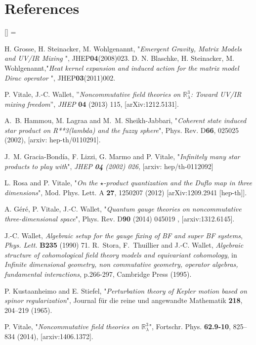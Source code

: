 \documentclass[a4paper,11pt,twoside]{article}
\numberwithin{equation}{section}
\theoremstyle{nonumberplain}
\newcounter{and}
\renewenvironment{thebibliography}[1]{%
\section*{References}%
\frenchspacing\small%
\begin{list}{[\arabic{enumi}]}%
{%
\usecounter{enumi}\parsep=2pt\topsep 0pt%
\settowidth{\labelwidth}{[#1]}%
\leftmargin=\labelwidth\advance\leftmargin\labelsep%
\rightmargin=0pt\itemsep=1pt\sloppy%
}%
}{\end{list}}
\begin{document}
\begin{thebibliography}{88}
 H. Grosse, H. Steinacker, M. Wohlgenannt, "{\it{Emergent Gravity, Matrix Models and UV/IR Mixing }}", JHEP{\bf{04}}(2008)023. D. N. Blaschke, H. Steinacker, M. Wohlgenannt,"{\it{Heat kernel expansion and induced action for the matrix model Dirac operator }}", JHEP{\bf{03}}(2011)002.

 P. Vitale, J.-C. Wallet, ''{\it{Noncommutative field theories on $\mathbb{R}^3_\lambda$: Toward UV/IR mixing freedom}}'', \textit{JHEP} \textbf{04} (2013) 115, [arXiv:1212.5131].

% 
A.~B. Hammou, M. Lagraa and M.~M. Sheikh-Jabbari, "{\it{Coherent state induced star product on R**3(lambda) and the fuzzy sphere}}", {Phys. Rev. D\textbf{66}, 025025 (2002)}, %
[arxiv: hep-th/0110291].%


%
J.~M. Gracia-Bond\'ia, F. Lizzi, G. Marmo and P. Vitale, "{\it{Infinitely many star products to play with}}", {\it{JHEP} \textbf{04} (2002) 026}, %
[arxiv: hep/th-0112092]

 L. Rosa and P. Vitale, "{\it{On the $\star$-product quantization and the Duflo map in three dimensions}}", Mod. Phys. Lett. A {\bf 27}, 1250207 (2012) 
[arXiv:1209.2941 [hep-th]].

	
% 
A. G\'er\'e, P. Vitale, J.-C. Wallet, "{\it{Quantum gauge theories on noncommutative three-dimensional space}}", {Phys. Rev. D\textbf{90} (2014) 045019 }, [arxiv:1312.6145].

 J.-C. Wallet, \textit{Algebraic setup for the gauge fixing of {BF} and super
  {BF} systems}, \textit{Phys. Lett.} \textbf{B235} (1990) 71. 
R.~Stora, F.~Thuillier and J.-C. Wallet, \textit{{Algebraic structure of
  cohomological field theory models and equivariant cohomology}}, {in
  \textit{Infinite dimensional geometry, non commutative geometry, operator
  algebras, fundamental interactions}, p.266-297, Cambridge Press (1995)}.


%
P. Kustaanheimo and E. Stiefel, "{\it{Perturbation theory of Kepler motion based on spinor regularization}}", {Journal f\"ur die reine und angewandte Mathematik \textbf{218}, 204--219 (1965)}.%

% 
P. Vitale, "{\it{Noncommutative field theories on $\mathbb{R}^3_\lambda$}}", 
{Fortschr. Phys. \textbf{62.9‐10}, 825--834 (2014)}, [arxiv:1406.1372].



\end{thebibliography}
\end{document}
